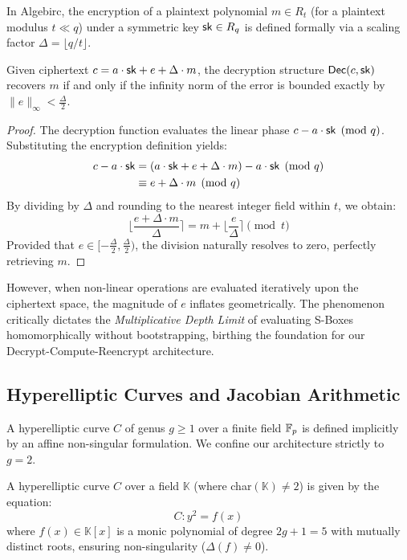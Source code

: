 In Algebirc, the encryption of a plaintext polynomial $m \in R_t$ (for a plaintext modulus $t \ll q$) under a symmetric key $\mathsf{sk} \in R_q$ is defined formally via a scaling factor $\Delta = \lfloor q/t \rfloor$.
\begin{theorem}
Given ciphertext $c = a \cdot \mathsf{sk} + e + \Delta \cdot m$, the decryption structure $\mathsf{Dec}(c, \mathsf{sk})$ recovers $m$ if and only if the infinity norm of the error is bounded exactly by $\|e\|_{\infty} < \frac{\Delta}{2}$.
\end{theorem}
\begin{proof}
    The decryption function evaluates the linear phase $c - a \cdot \mathsf{sk} \pmod q$. Substituting the encryption definition yields:
    \begin{align*}
        c - a \cdot \mathsf{sk} &= (a \cdot \mathsf{sk} + e + \Delta \cdot m) - a \cdot \mathsf{sk} \pmod q \\
        &\equiv e + \Delta \cdot m \pmod q
    \end{align*}
    By dividing by $\Delta$ and rounding to the nearest integer field within $t$, we obtain:
    \begin{equation*}
        \lfloor \frac{e + \Delta \cdot m}{\Delta} \rceil = m + \lfloor \frac{e}{\Delta} \rceil \pmod t
    \end{equation*}
    Provided that $e \in [-\frac{\Delta}{2}, \frac{\Delta}{2})$, the division naturally resolves to zero, perfectly retrieving $m$.
\end{proof}

However, when non-linear operations are evaluated iteratively upon the ciphertext space, the magnitude of $e$ inflates geometrically. The phenomenon critically dictates the \textit{Multiplicative Depth Limit} of evaluating S-Boxes homomorphically without bootstrapping, birthing the foundation for our Decrypt-Compute-Reencrypt architecture.

\subsection{Hyperelliptic Curves and Jacobian Arithmetic}
A hyperelliptic curve $C$ of genus $g \ge 1$ over a finite field $\mathbb{F}_p$ is defined implicitly by an affine non-singular formulation. We confine our architecture strictly to $g=2$.

\begin{definition}
A hyperelliptic curve $C$ over a field $\mathbb{K}$ (where char$(\mathbb{K}) \ne 2$) is given by the equation:
\begin{equation}
    C: y^2 = f(x)
\end{equation}
where $f(x) \in \mathbb{K}[x]$ is a monic polynomial of degree $2g+1 = 5$ with mutually distinct roots, ensuring non-singularity ($\Delta(f) \ne 0$).
\end{definition}


